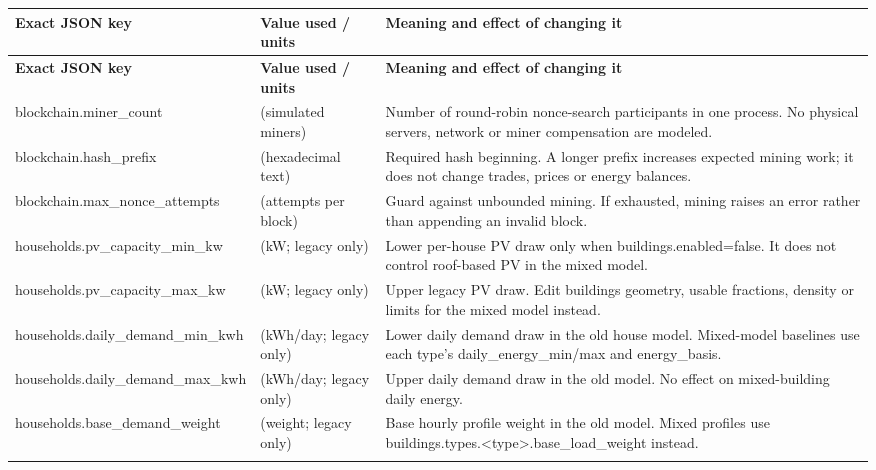 \documentclass[a4paper,11pt]{article}
\begin{document}
\begingroup\small
\begin{longtable}{>{\RaggedRight\arraybackslash}p{}>{\RaggedRight\arraybackslash}p{}>{\RaggedRight\arraybackslash}p{}}
\toprule
\textbf{Exact JSON key} & \textbf{Value used / units} & \textbf{Meaning and effect of changing it} \\ \midrule
\endfirsthead
\toprule
\textbf{Exact JSON key} & \textbf{Value used / units} & \textbf{Meaning and effect of changing it} \\ \midrule
\endhead
blockchain.\allowbreak{}miner\_\allowbreak{}count & 10 (simulated miners) & Number of round-robin nonce-search participants in one process. No physical servers, network or miner compensation are modeled. \\ \addlinespace[3pt]
blockchain.\allowbreak{}hash\_\allowbreak{}prefix & 000 (hexadecimal text) & Required hash beginning. A longer prefix increases expected mining work; it does not change trades, prices or energy balances. \\ \addlinespace[3pt]
blockchain.\allowbreak{}max\_\allowbreak{}nonce\_\allowbreak{}attempts & 5000000 (attempts per block) & Guard against unbounded mining. If exhausted, mining raises an error rather than appending an invalid block. \\ \addlinespace[3pt]
households.\allowbreak{}pv\_\allowbreak{}capacity\_\allowbreak{}min\_\allowbreak{}kw & 2 (kW; legacy only) & Lower per-house PV draw only when buildings.enabled=false. It does not control roof-based PV in the mixed model. \\ \addlinespace[3pt]
households.\allowbreak{}pv\_\allowbreak{}capacity\_\allowbreak{}max\_\allowbreak{}kw & 8 (kW; legacy only) & Upper legacy PV draw. Edit buildings geometry, usable fractions, density or limits for the mixed model instead. \\ \addlinespace[3pt]
households.\allowbreak{}daily\_\allowbreak{}demand\_\allowbreak{}min\_\allowbreak{}kwh & 8 (kWh/day; legacy only) & Lower daily demand draw in the old house model.\allowbreak{} Mixed-model baselines use each type's daily\_\allowbreak{}energy\_\allowbreak{}min/max and energy\_\allowbreak{}basis.\allowbreak{} \\ \addlinespace[3pt]
households.\allowbreak{}daily\_\allowbreak{}demand\_\allowbreak{}max\_\allowbreak{}kwh & 24 (kWh/day; legacy only) & Upper daily demand draw in the old model. No effect on mixed-building daily energy. \\ \addlinespace[3pt]
households.\allowbreak{}base\_\allowbreak{}demand\_\allowbreak{}weight & 0.25 (weight; legacy only) & Base hourly profile weight in the old model.\allowbreak{} Mixed profiles use buildings.\allowbreak{}types.\allowbreak{}<type>.\allowbreak{}base\_\allowbreak{}load\_\allowbreak{}weight instead.\allowbreak{} \\ \addlinespace[3pt]
\bottomrule
\end{longtable}
\endgroup
\end{document}
